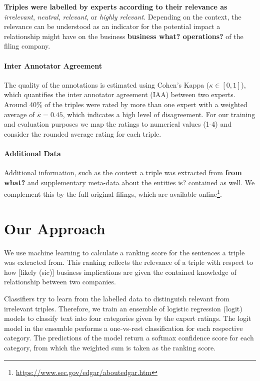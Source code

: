 \textbf{Triples were labelled by experts according to their relevance as} \textit{irrelevant}, \textit{neutral}, \textit{relevant}, or \textit{highly relevant}.
Depending on the context, the relevance can be understood as an indicator for the potential impact a relationship might have on the business \textbf{business what? operations?} of the filing company. 

{\setlength{\parindent}{0cm}
\paragraph{\textbf{Inter Annotator Agreement}}
The quality of the annotations is estimated using Cohen's Kappa ($\kappa\in [0,1]$), which quantifies the inter annotator agreement (IAA) between two experts\cite{ir}.
Around 40\% of the triples were rated by more than one expert with a weighted average of $\overline{\kappa}=0.45$, which indicates a high level of disagreement.
For our training and evaluation purposes we map the ratings to numerical values (1-4) and consider the rounded average rating for each triple.
}

{\setlength{\parindent}{0cm}
\paragraph{\textbf{Additional Data}}
Additional information, such as the context a triple was extracted from \textbf{from what?} and supplementary meta-data about the entities is? contained as well.
We complement this by the full original filings, which are available online\footnote{\url{https://www.sec.gov/edgar/aboutedgar.htm}}.
}

\section{Our Approach}
We use machine learning to calculate a ranking score for the sentences a triple was extracted from.
This ranking reflects the relevance of a triple with respect to how [likely (sic)] business implications are given the contained knowledge of relationship between two companies.

Classifiers try to learn from the labelled data to distinguish relevant from irrelevant triples.
Therefore, we train an ensemble of logistic regression (logit) models to classify text into four categories given by the expert ratings.
The logit model in the ensemble performs a one-vs-rest classification for each respective category.
The predictions of the model return a softmax confidence score for each category, from which the weighted sum is taken as the ranking score.

